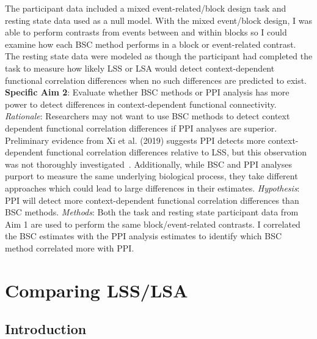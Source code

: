 \documentclass[phd,figures,tables,ackpage,abstractpage,publicabstractpage]{uithesis}
\begin{document}
The participant data included a mixed event-related/block design task and resting
state data used as a null model.
With the mixed event/block design, I was able to perform contrasts from events
between and within blocks so I could examine how each BSC method performs
in a block or event-related contrast.
The resting state data were modeled as though the participant had completed the task
to measure how likely LSS or LSA would detect context-dependent functional correlation
differences when no such differences are predicted to exist.
\newline
\newline
\textbf{Specific Aim 2}: Evaluate whether BSC methods or PPI analysis has
more power to detect differences in context-dependent functional connectivity.
\newline
\newline
\textit{Rationale}: Researchers may not want to use BSC methods
to detect context dependent functional correlation differences if
PPI analyses are superior.
Preliminary evidence from Xi et al. (2019) suggests PPI detects more
context-dependent functional correlation differences relative to LSS,
but this observation was not thoroughly investigated~\cite{Di2019}.
Additionally, while BSC and PPI analyses purport to measure the same underlying
biological process, they take different approaches which could lead to large differences
in their estimates.
\newline
\newline
\textit{Hypothesis}:
PPI will detect more context-dependent functional correlation differences than BSC methods.
\newline
\newline
\textit{Methods}:
Both the task and resting state participant data from Aim 1 are used to perform
the same block/event-related contrasts.
I correlated the BSC estimates with the PPI analysis estimates to identify which BSC method
correlated more with PPI.


\chapter{Comparing LSS/LSA}

\section{Introduction}
\label{intro}
\end{document}
